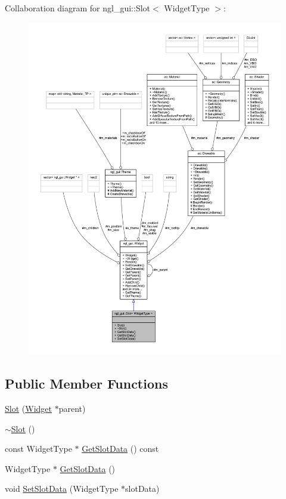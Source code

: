 Collaboration diagram for ngl\+\_\+gui\+:\+:Slot$<$ Widget\+Type $>$\+:
\nopagebreak
\begin{figure}[H]
\begin{center}
\leavevmode
\includegraphics[width=350pt]{classngl__gui_1_1_slot__coll__graph}
\end{center}
\end{figure}
\subsection*{Public Member Functions}
\begin{DoxyCompactItemize}
\item 
\mbox{\hyperlink{classngl__gui_1_1_slot_ab34b598e916e664a250c3734dddb58c3}{Slot}} (\mbox{\hyperlink{classngl__gui_1_1_widget}{Widget}} $\ast$parent)
\item 
\mbox{\hyperlink{classngl__gui_1_1_slot_a348b414cab2f6746aa469c4d1a2ab258}{$\sim$\+Slot}} ()
\item 
const Widget\+Type $\ast$ \mbox{\hyperlink{classngl__gui_1_1_slot_a40dffade72ef8f4a331c846ead3a71c9}{Get\+Slot\+Data}} () const
\item 
Widget\+Type $\ast$ \mbox{\hyperlink{classngl__gui_1_1_slot_a82f84f6347bb881094216db92d8bd274}{Get\+Slot\+Data}} ()
\item 
void \mbox{\hyperlink{classngl__gui_1_1_slot_a678edc3301f986a708371537d221837b}{Set\+Slot\+Data}} (Widget\+Type $\ast$slot\+Data)
\end{DoxyCompactItemize}
